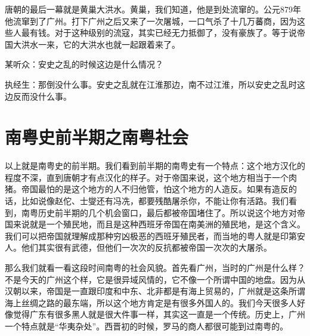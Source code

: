 唐朝的最后一幕就是黄巢大洪水。黄巢，我们知道，他是到处流窜的。公元879年他流窜到了广州。打下广州之后又来了一次屠城，一口气杀了十几万蕃商，因为这些人最有钱。对于这种级别的流寇，其实已经无力抵御了，没有豪族了。等于说帝国大洪水一来，它的大洪水也就一起跟着来了。

\begin{quoted}
某听众：安史之乱的时候这边是什么情况？

执经生：那倒没什么事。安史之乱就在江淮那边，南不过江淮，所以安史之乱时这边反而没什么事。
\end{quoted}

\section{南粤史前半期之南粤社会}

以上就是南粤史的前半期。我们看到前半期的南粤史有一个特点：这个地方汉化的程度不深，直到唐朝才有点汉化的样子。对于帝国来说，这个地方相当于一个肉猪。帝国最怕的是这个地方的人不归他管，怕这个地方的人造反。如果有造反的话，比如说像赵佗、士燮还有冯冼，都要残酷屠杀你，不能让你有活路。我们看到，南粤历史前半期的几个机会窗口，最后都被帝国堵住了。所以说这个地方对帝国来说就是一个殖民地，而且是这种西班牙帝国在南美洲的殖民地，是这个含义。我们可以把帝国就理解成那种穷凶极恶的西班牙殖民者，而当地的粤人就是印第安人。他们其实很有武德，但他们一次次的反抗都被帝国一次次的大屠杀。

那么我们就看一看这段时间南粤的社会风貌。首先看广州，当时的广州是什么样？不是今天的广州这个样，它是很异域风情的，它不像一个所谓中国的地盘。因为从汉朝以来，帝国是一直跟印度和中东、北非都是有海上贸易的，广州就是这条所谓海上丝绸之路的最东端，所以这个地方肯定是有很多外国人的。我们今天很多人好像觉得广东有很多黑人就是很大件事一样，其实这一直是一个传统。历史上，广州一个特点就是“华夷杂处”。西晋初的时候，罗马的商人都很可能到过南粤的。

